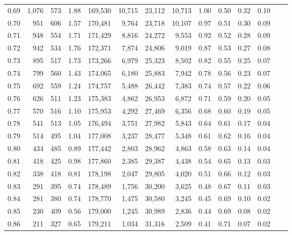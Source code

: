 \begin{tabular}{rrrrrrrrrrrrrr}
0.69 &  1,076 &  573 &    1.88 &  169,530 &   10,715 &  23,112 &  10,713 &  1.00 &  0.50 &  0.32 &      0.10 \\
0.70 &    951 &  606 &    1.57 &  170,481 &    9,764 &  23,718 &  10,107 &  0.97 &  0.51 &  0.30 &      0.09 \\
0.71 &    948 &  554 &    1.71 &  171,429 &    8,816 &  24,272 &   9,553 &  0.92 &  0.52 &  0.28 &      0.09 \\
0.72 &    942 &  534 &    1.76 &  172,371 &    7,874 &  24,806 &   9,019 &  0.87 &  0.53 &  0.27 &      0.08 \\
0.73 &    895 &  517 &    1.73 &  173,266 &    6,979 &  25,323 &   8,502 &  0.82 &  0.55 &  0.25 &      0.07 \\
0.74 &    799 &  560 &    1.43 &  174,065 &    6,180 &  25,883 &   7,942 &  0.78 &  0.56 &  0.23 &      0.07 \\
0.75 &    692 &  559 &    1.24 &  174,757 &    5,488 &  26,442 &   7,383 &  0.74 &  0.57 &  0.22 &      0.06 \\
0.76 &    626 &  511 &    1.23 &  175,383 &    4,862 &  26,953 &   6,872 &  0.71 &  0.59 &  0.20 &      0.05 \\
0.77 &    570 &  516 &    1.10 &  175,953 &    4,292 &  27,469 &   6,356 &  0.68 &  0.60 &  0.19 &      0.05 \\
0.78 &    541 &  513 &    1.05 &  176,494 &    3,751 &  27,982 &   5,843 &  0.64 &  0.61 &  0.17 &      0.04 \\
0.79 &    514 &  495 &    1.04 &  177,008 &    3,237 &  28,477 &   5,348 &  0.61 &  0.62 &  0.16 &      0.04 \\
0.80 &    434 &  485 &    0.89 &  177,442 &    2,803 &  28,962 &   4,863 &  0.58 &  0.63 &  0.14 &      0.04 \\
0.81 &    418 &  425 &    0.98 &  177,860 &    2,385 &  29,387 &   4,438 &  0.54 &  0.65 &  0.13 &      0.03 \\
0.82 &    338 &  418 &    0.81 &  178,198 &    2,047 &  29,805 &   4,020 &  0.51 &  0.66 &  0.12 &      0.03 \\
0.83 &    291 &  395 &    0.74 &  178,489 &    1,756 &  30,200 &   3,625 &  0.48 &  0.67 &  0.11 &      0.03 \\
0.84 &    281 &  380 &    0.74 &  178,770 &    1,475 &  30,580 &   3,245 &  0.45 &  0.69 &  0.10 &      0.02 \\
0.85 &    230 &  409 &    0.56 &  179,000 &    1,245 &  30,989 &   2,836 &  0.44 &  0.69 &  0.08 &      0.02 \\
0.86 &    211 &  327 &    0.65 &  179,211 &    1,034 &  31,316 &   2,509 &  0.41 &  0.71 &  0.07 &      0.02 \\

\end{tabular}
